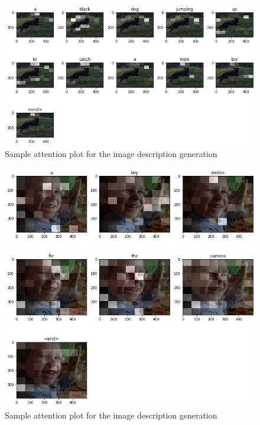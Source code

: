 \begin{figure}[ht!]
    \begin{center}
        \includegraphics[scale=0.45]{chapters/5/intfig/inception_and_gru_with_attention_plot_attention.jpg}
    \end{center}
    \caption{Sample attention plot for the image description generation}
    \label{res:attention_plot2}
\end{figure}

\begin{figure}[ht!]
    \begin{center}
        \includegraphics[scale=0.5]{chapters/5/intfig/vgg16_and_gru_with_attention_plot_attention.jpg}
    \end{center}
    \caption{Sample attention plot for the image description generation}
    \label{res:attention_plot}
\end{figure}

